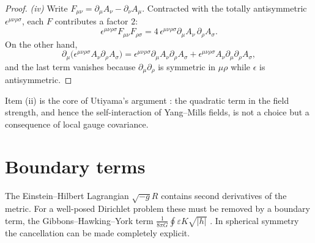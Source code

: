 \begin{proof}
\emph{(iv)} Write $F_{\mu\nu}=\partial_\mu A_\nu-\partial_\nu A_\mu$. Contracted with the totally antisymmetric $\epsilon^{\mu\nu\rho\sigma}$, each $F$ contributes a factor $2$:
\[
\epsilon^{\mu\nu\rho\sigma}F_{\mu\nu}F_{\rho\sigma}=4\,\epsilon^{\mu\nu\rho\sigma}\partial_\mu A_\nu\,\partial_\rho A_\sigma .
\]
On the other hand,
\[
\partial_\mu\bigl(\epsilon^{\mu\nu\rho\sigma}A_\nu\partial_\rho A_\sigma\bigr)=\epsilon^{\mu\nu\rho\sigma}\partial_\mu A_\nu\partial_\rho A_\sigma+\epsilon^{\mu\nu\rho\sigma}A_\nu\partial_\mu\partial_\rho A_\sigma ,
\]
and the last term vanishes because $\partial_\mu\partial_\rho$ is symmetric in $\mu\rho$ while $\epsilon$ is antisymmetric.
\end{proof}


Item (ii) is the core of Utiyama's argument \cite{Utiyama1956}: the quadratic term in the field strength, and hence the self-interaction of Yang--Mills fields, is not a choice but a consequence of local gauge covariance.

\section{Boundary terms}

The Einstein--Hilbert Lagrangian $\sqrt{-g}R$ contains second derivatives of the metric. For a well-posed Dirichlet problem these must be removed by a boundary term, the Gibbons--Hawking--York term $\frac1{8\pi G}\oint\varepsilon K\sqrt{|h|}$ \cite{GibbonsHawking1977,York1972}. In spherical symmetry the cancellation can be made completely explicit.

